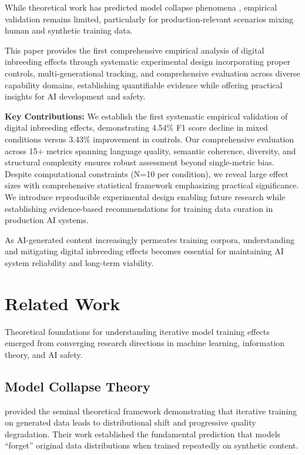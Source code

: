 \documentclass{article}
\begin{document}
While theoretical work has predicted model collapse phenomena \citep{shumailov2023curse}, empirical validation remains limited, particularly for production-relevant scenarios mixing human and synthetic training data.

This paper provides the first comprehensive empirical analysis of digital inbreeding effects through systematic experimental design incorporating proper controls, multi-generational tracking, and comprehensive evaluation across diverse capability domains, establishing quantifiable evidence while offering practical insights for AI development and safety.

\textbf{Key Contributions:}
We establish the first systematic empirical validation of digital inbreeding effects, demonstrating 4.54\% F1 score decline in mixed conditions versus 3.43\% improvement in controls. Our comprehensive evaluation across 15+ metrics spanning language quality, semantic coherence, diversity, and structural complexity ensures robust assessment beyond single-metric bias. Despite computational constraints (N=10 per condition), we reveal large effect sizes with comprehensive statistical framework emphasizing practical significance. We introduce reproducible experimental design enabling future research while establishing evidence-based recommendations for training data curation in production AI systems.

As AI-generated content increasingly permeates training corpora, understanding and mitigating digital inbreeding effects becomes essential for maintaining AI system reliability and long-term viability.

\section{Related Work}

Theoretical foundations for understanding iterative model training effects emerged from converging research directions in machine learning, information theory, and AI safety.

\subsection{Model Collapse Theory}

\citet{shumailov2023curse} provided the seminal theoretical framework demonstrating that iterative training on generated data leads to distributional shift and progressive quality degradation. Their work established the fundamental prediction that models ``forget'' original data distributions when trained repeatedly on synthetic content.
\end{document}
